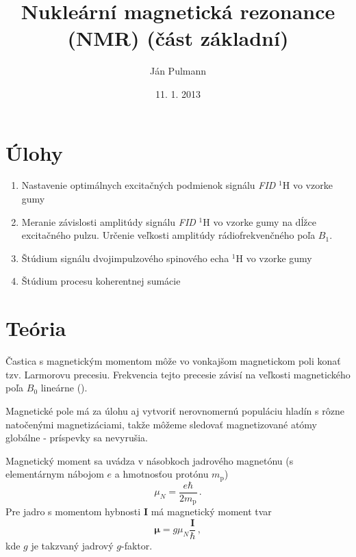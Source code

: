 \documentclass[a4paper, 10pt]{article}
\newcommand{\di}[1]{\ensuremath{_\mathrm{#1}}}
\begin{document}
\title{Nukleární magnetická rezonance (NMR) (část základní)}
\author{Ján Pulmann}
\date{11. 1. 2013}
\maketitle
\section*{Úlohy}
\begin{enumerate}

	\item Nastavenie optimálnych excitačných podmienok signálu \textit{FID} $^1\mathrm H$ vo vzorke gumy
	\item Meranie závislosti amplitúdy signálu \textit{FID} $^1\mathrm H$ vo vzorke gumy na dĺžce excitačného pulzu. Určenie veľkosti amplitúdy rádiofrekvenčného poľa $B_1$.
    \item Štúdium signálu dvojimpulzového spinového echa $^1\mathrm H$ vo vzorke gumy
    \item Štúdium procesu koherentnej sumácie
 \end{enumerate}
\section*{Teória}
Častica s magnetickým momentom môže vo vonkajšom magnetickom poli konať tzv. Larmorovu precesiu. Frekvencia tejto precesie závisí na veľkosti magnetického poľa $B_0$ lineárne (\cite{stud}). 

Magnetické pole má za úlohu aj vytvoriť nerovnomernú populáciu hladín s rôzne natočenými magnetizáciami, takže môžeme sledovať magnetizované atómy globálne - príspevky sa nevyrušia. 

Magnetický moment sa uvádza v násobkoch jadrového magnetónu (s elementárnym nábojom $e$ a hmotnosťou protónu $m\di p$)
\begin{equation}
\label{eq:teor:magneton}
\mu_N=\frac{e\hbar}{2m\di p }\,.
\end{equation}
Pre jadro s momentom hybnosti $\bm I$ má magnetický moment tvar
\begin{equation}
\label{eq:teor:magneticky_moment}
\bm \mu = g\mu_N \frac{\bm I}{\hbar}\,,
\end{equation}
kde $g$ je takzvaný jadrový $g$-faktor. 
\end{document}
